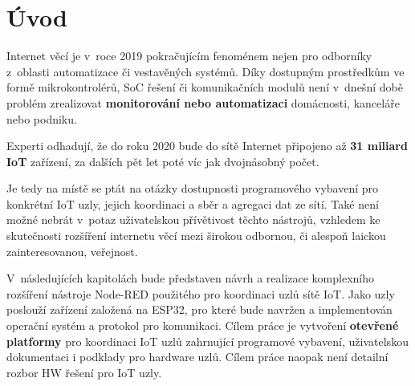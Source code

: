 \chapter{Úvod}
\label{ch:uvod}

Internet věcí je v~roce 2019 pokračujícím fenoménem nejen pro odborníky z~oblasti automatizace či vestavěných systémů.
Díky dostupným prostředkům ve formě mikrokontrolérů, SoC řešení či komunikačních modulů není v~dnešní době problém
zrealizovat \textbf{monitorování nebo automatizaci} domácnosti, kanceláře nebo podniku.

Experti odhadují, že do roku 2020 bude do sítě Internet připojeno až \textbf{31 miliard IoT} zařízení, za dalších pět
let poté víc jak dvojnásobný počet.

Je tedy na místě se ptát na otázky dostupnosti programového vybavení pro konkrétní IoT uzly, jejich koordinaci a sběr
a agregaci dat ze sítí.
Také není možné nebrát v~potaz uživatelskou přívětivost těchto nástrojů, vzhledem ke
skutečnosti rozšíření internetu věcí mezi širokou odbornou, či alespoň laickou zainteresovanou, veřejnost.

V~následujících kapitolách bude představen návrh a realizace komplexního rozšíření nástroje Node-RED použitého pro
koordinaci uzlů sítě IoT. Jako uzly poslouží zařízení založená na ESP32, pro které bude navržen a implementován
operační systém a protokol pro komunikaci.
Cílem práce je vytvoření \textbf{otevřené platformy} pro koordinaci IoT uzlů zahrnující programové vybavení,
uživatelskou dokumentaci i podklady pro hardware uzlů. 
Cílem práce naopak není detailní rozbor HW řešení pro IoT uzly.


\cite{ESP32Datasheet}